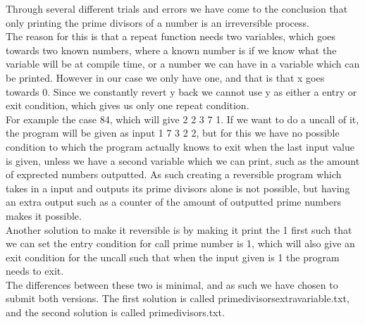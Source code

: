 \documentclass[10pt,a4paper]{article}      %
\begin{document}
Through several different trials and errors we have come to the conclusion that only printing the prime divisors of a number is an irreversible process. 
\\
The reason for this is that a repeat function needs two variables, which goes towards two known numbers, where a known number is if we know what the variable will be at compile time, or a number we can have in a variable which can be printed. However in our case we only have one, and that is that x goes towards 0. Since we constantly revert y back we cannot use y as either a entry or exit condition, which gives us only one repeat condition.
\\
For example the case 84, which will give 2 2 3 7 1. If we want to do a uncall of it, the program will be given as input 1 7 3 2 2, but for this we have no possible condition to which the program actually knows to exit when the last input value is given, unless we have a second variable which we can print, such as the amount of exprected numbers outputted. As such creating a reversible program which takes in a input and outputs its prime divisors alone is not possible, but having an extra output such as a counter of the amount of outputted prime numbers makes it possible.
\\
Another solution to make it reversible is by making it print the 1 first such that we can set the entry condition for call prime number is 1, which will also give an exit condition for the uncall such that when the input given is 1 the program needs to exit.
\\
The differences between these two is minimal, and as such we have chosen to submit both versions. The first solution is called primedivisorsextravariable.txt, and the second solution is called primedivisors.txt.
\end{document}
